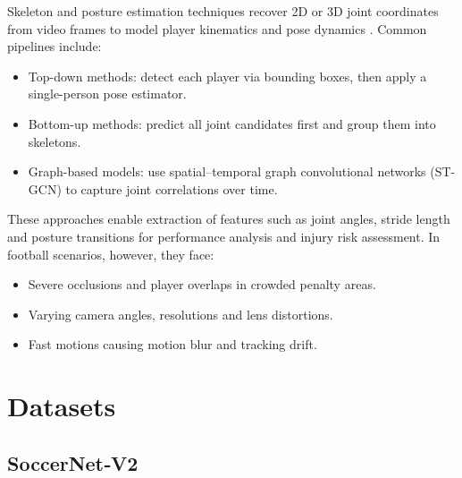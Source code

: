 Skeleton and posture estimation techniques recover 2D or 3D joint coordinates from video frames to model player kinematics and pose dynamics \cite{elaoud_skeleton-based_2020, wang_skeleton_two-stream_2023, reilly__skeleton_just_pi_2023}. Common pipelines include:
\begin{itemize}
    \item Top-down methods: detect each player via bounding boxes, then apply a single-person pose estimator.
    \item Bottom-up methods: predict all joint candidates first and group them into skeletons.
    \item Graph-based models: use spatial–temporal graph convolutional networks (ST-GCN) to capture joint correlations over time\cite{yan_spatial_temporal_graph_convolutional_2018}.
\end{itemize}
These approaches enable extraction of features such as joint angles, stride length and posture transitions for performance analysis and injury risk assessment. In football scenarios, however, they face:
\begin{itemize}
    \item Severe occlusions and player overlaps in crowded penalty areas.
    \item Varying camera angles, resolutions and lens distortions.
    \item Fast motions causing motion blur and tracking drift\cite{survey_of_survey}.
\end{itemize} 


\section{Datasets}
\label{sec:datasets}


\subsection{SoccerNet‑V2}
\label{ssec:soccernet}

